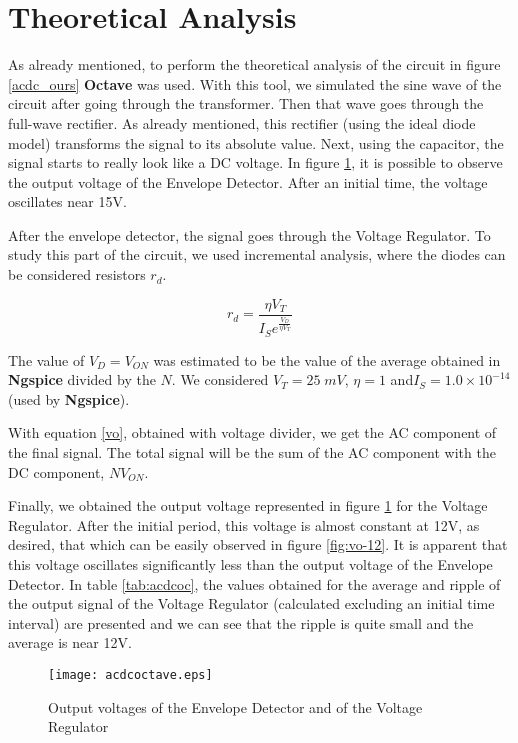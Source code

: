 \newpage
\section{Theoretical Analysis}
\label{sec:analysis}

As already mentioned, to perform the theoretical analysis of the circuit in figure \ref{acdc_ours} {\bf Octave} was used. With this tool, we simulated the sine wave of the circuit after going through the transformer. Then that wave goes through the full-wave rectifier. As already mentioned, this rectifier (using the ideal diode model) transforms the signal to its absolute value. Next, using the capacitor, the signal starts to really look like a DC voltage. In figure \ref{fig:acdcoc}, it is possible to observe the output voltage of the Envelope Detector. After an initial time, the voltage oscillates near 15V.

After the envelope detector, the signal goes through the Voltage Regulator. To study this part of the circuit, we used incremental analysis, where the diodes can be considered resistors $r_d$.

\begin{equation}
        r_d = \frac{\eta V_T}{I_Se^{\frac{V_D}{\eta V_T}}}
        \label{rd}
\end{equation}

The value of $V_D = V_{ON}$ was estimated to be the value of the average obtained in {\bf Ngspice} divided by the $N$. We considered $V_T=25\;mV$, $\eta = 1$ and$I_S = 1.0 \times 10^{-14}$ (used by {\bf Ngspice}).

With equation \ref{vo}, obtained with voltage divider, we get the AC component of the final signal. The total signal will be the sum of the AC component with the DC component, $N V_{ON}$.

Finally, we obtained the output voltage represented in figure \ref{fig:acdcoc} for the Voltage Regulator. After the initial period, this voltage is almost constant at 12V, as desired, that which can be easily observed in figure \ref{fig:vo-12}. It is apparent that this voltage oscillates significantly less than the output voltage of the Envelope Detector. In table \ref{tab:acdcoc}, the values obtained for the average and ripple of the output signal of the Voltage Regulator (calculated excluding an initial time interval) are presented and we can see that the ripple is quite small and the average is near 12V.

\begin{figure}[H]
  \centering
  \texttt{[image: acdcoctave.eps]}
  \caption{Output voltages of the Envelope Detector and of the Voltage Regulator}
  \label{fig:acdcoc}
\end{figure}

